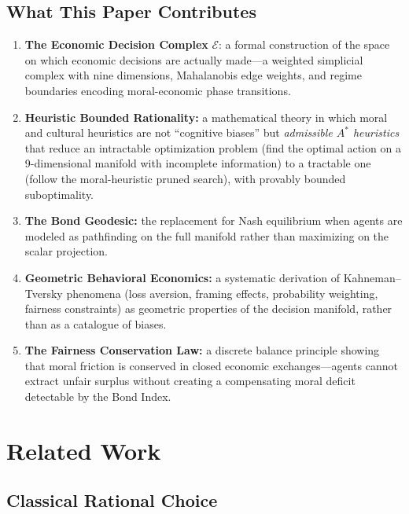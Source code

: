 \documentclass[12pt]{article}
\theoremstyle{definition}
\theoremstyle{remark}
\newcommand{\E}{\mathcal{E}}               %
\begin{document}
\subsection{What This Paper Contributes}

\begin{enumerate}
    \item \textbf{The Economic Decision Complex} $\E$: a formal construction of the space on which economic decisions are actually made---a weighted simplicial complex with nine dimensions, Mahalanobis edge weights, and regime boundaries encoding moral-economic phase transitions.

    \item \textbf{Heuristic Bounded Rationality:} a mathematical theory in which moral and cultural heuristics are not ``cognitive biases'' but \emph{admissible $A^*$ heuristics} that reduce an intractable optimization problem (find the optimal action on a 9-dimensional manifold with incomplete information) to a tractable one (follow the moral-heuristic pruned search), with provably bounded suboptimality.

    \item \textbf{The Bond Geodesic:} the replacement for Nash equilibrium when agents are modeled as pathfinding on the full manifold rather than maximizing on the scalar projection.

    \item \textbf{Geometric Behavioral Economics:} a systematic derivation of Kahneman--Tversky phenomena (loss aversion, framing effects, probability weighting, fairness constraints) as geometric properties of the decision manifold, rather than as a catalogue of biases.

    \item \textbf{The Fairness Conservation Law:} a discrete balance principle showing that moral friction is conserved in closed economic exchanges---agents cannot extract unfair surplus without creating a compensating moral deficit detectable by the Bond Index.
\end{enumerate}


\section{Related Work}
\label{sec:related}

\subsection{Classical Rational Choice}
\end{document}
